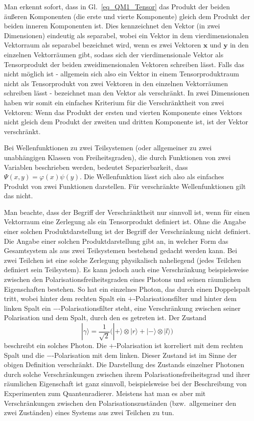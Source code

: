 Man erkennt sofort, dass in Gl.\ \ref{eq_QM1_Tensor} das Produkt der beiden \"au\ss eren Komponenten 
(die erste und vierte Komponente) gleich dem 
Produkt der beiden inneren Komponenten ist. Dies kennzeichnet den Vektor (in zwei Dimensionen) eindeutig
als separabel, wobei ein Vektor in dem vierdimensionalen Vektorraum als separabel bezeichnet wird, wenn
es zwei Vektoren $\pmb{x}$ und $\pmb{y}$ in den einzelnen Vektorr\"aumen gibt, sodass sich der
vierdimensionale Vektor als Tensorprodukt der beiden zweidimensionalen Vektoren schreiben l\"asst. 
Falls das nicht m\"oglich ist - allgemein sich also ein Vektor in einem Tensorproduktraum nicht als Tensorprodukt
von zwei Vektoren in den einzelnen Vektorr\"aumen schreiben l\"asst - bezeichnet man den Vektor
als verschr\"ankt. In zwei Dimensionen haben wir somit ein einfaches Kriterium f\"ur die Verschr\"anktheit
von zwei Vektoren: Wenn das Produkt der ersten und vierten Komponente eines Vektors nicht gleich dem
Produkt der zweiten und dritten Komponente ist, ist der Vektor verschr\"ankt. 

Bei Wellenfunktionen zu zwei Teilsystemen (oder allgemeiner zu zwei unabh\"angigen Klassen von
Freiheitsgraden), die durch Funktionen von zwei Variablen beschrieben werden, bedeutet Separierbarkeit,
dass $\Psi(x,y)= \varphi(x) \psi(y)$. Die Wellenfunktion l\"asst sich also als einfaches Produkt von zwei
Funktionen darstellen. F\"ur verschr\"ankte Wellenfunktionen gilt das nicht. 

Man beachte, dass der Begriff der Verschr\"anktheit nur sinnvoll ist, wenn f\"ur einen Vektorraum eine
Zerlegung als ein Tensorprodukt definiert ist. Ohne die Angabe einer solchen Produktdarstellung ist
der Begriff der Verschr\"ankung nicht definiert. Die Angabe einer solchen Produktdarstellung gibt an,
in welcher Form das Gesamtsystem als aus zwei Teilsystemen bestehend gedacht werden kann. Bei
zwei Teilchen ist eine solche Zerlegung physikalisch naheliegend (jedes Teilchen definiert sein Teilsystem). 
Es kann jedoch auch eine Verschr\"ankung beispielsweise zwischen den Polarisationsfreiheitsgraden
eines Photons und seinen r\"aumlichen Eigenschaften bestehen. So hat ein einzelnes Photon, das
durch einen Doppelspalt tritt, wobei hinter dem rechten Spalt ein $+$-Polarisationsfilter und hinter dem
linken Spalt ein $-$-Polarisationsfilter steht, eine Verschr\"ankung zwischen seiner Polarisation und dem
Spalt, durch den es getreten ist. Der Zustand
\begin{equation}
        | \gamma \rangle = \frac{1}{\sqrt{2}} \Big( |+\rangle \otimes |r \rangle + |- \rangle \otimes |l\rangle \Big)
\end{equation}
beschreibt ein solches Photon. Die $+$-Polarisation ist korreliert mit dem rechten Spalt und die $-$-Polarisation
mit dem linken. Dieser Zustand ist im Sinne der obigen Definition verschr\"ankt. Die Darstellung des Zustands
einzelner Photonen durch solche Verschr\"ankungen
zwischen ihrem Polarisationsfreiheitsgrad und ihrer r\"aumlichen Eigenschaft ist
ganz sinnvoll, beispielsweise bei der Beschreibung von Experimenten zum Quantenradierer. Meistens hat man es aber mit
Verschr\"ankungen zwischen den Polarisationszust\"anden (bzw.\ allgemeiner den zwei Zust\"anden) 
eines Systems aus zwei Teilchen zu tun. 

